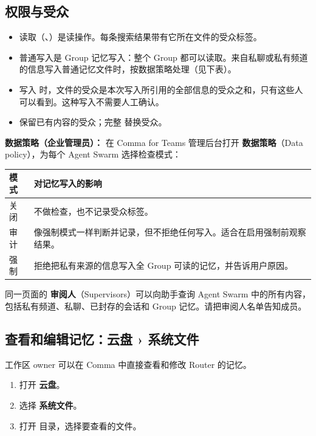 \documentclass[UTF8,a4paper,11pt]{ctexart}
\begin{document}
\subsection{权限与受众}\label{sec:memory-ifc}

\begin{itemize}
  \item 读取（、）是读操作。每条搜索结果带有它所在文件的受众标签。
  \item 普通写入是 Group 记忆写入：整个 Group 都可以读取。来自私聊或私有频道的信息写入普通记忆文件时，按数据策略处理（见下表）。
  \item 写入  时，文件的受众是本次写入所引用的全部信息的受众之和，只有这些人可以看到。这种写入不需要人工确认。
  \item {} 保留已有内容的受众；完整  替换受众。
\end{itemize}

\textbf{数据策略（企业管理员）：} 在 Comma for Teams 管理后台打开 \textbf{数据策略}（Data policy），为每个 Agent Swarm 选择检查模式：

\begin{longtable}{P{2.6cm}P{11.2cm}}
\toprule
模式 & 对记忆写入的影响 \\
\midrule
\endhead
关闭 & 不做检查，也不记录受众标签。 \\
审计 & 像强制模式一样判断并记录，但不拒绝任何写入。适合在启用强制前观察结果。 \\
强制 & 拒绝把私有来源的信息写入全 Group 可读的记忆，并告诉用户原因。 \\
\bottomrule
\end{longtable}

同一页面的 \textbf{审阅人}（Supervisors）可以向助手查询 Agent Swarm 中的所有内容，包括私有频道、私聊、已封存的会话和 Group 记忆。请把审阅人名单告知成员。

\subsection{查看和编辑记忆：云盘 › 系统文件}\label{sec:system-files}

工作区 owner 可以在 Comma 中直接查看和修改 Router 的记忆。

\begin{enumerate}
  \item 打开 \textbf{云盘}。
  \item 选择 \textbf{系统文件}。
  \item 打开  目录，选择要查看的文件。
\end{enumerate}
\end{document}
